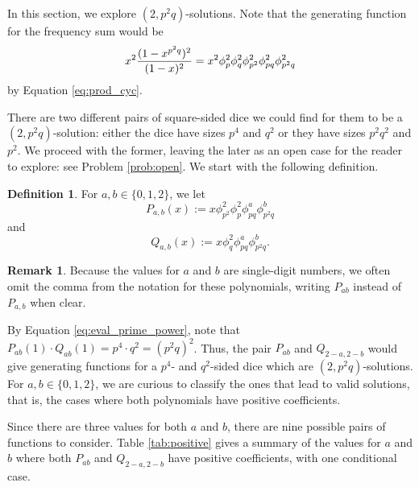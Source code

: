 \documentclass[11pt]{amsart}
\numberwithin{equation}{section}
\theoremstyle{plain}
\theoremstyle{definition}
\newtheorem{definition}[equation]{Definition}
\newtheorem{remark}[equation]{Remark}
\begin{document}
In this section, we explore $(2,p^2q)$-solutions. Note that the generating function for the frequency sum would be
\[x^2{(1-x^{p^2q})^2\over (1-x)^2}=x^2\phi_p^2\phi_q^2\phi_{p^2}^2\phi_{pq}^2\phi_{p^2q}^2\]
by Equation \eqref{eq:prod_cyc}.

There are two different pairs of square-sided dice we could find for them to be a $(2,p^2q)$-solution: either the dice have sizes $p^4$ and $q^2$ or they have sizes $p^2q^2$ and $p^2$. We proceed with the former, leaving the later as an open case for the reader to explore: see Problem \ref{prob:open}. We start with the following definition.

\begin{definition}
For $a,b\in \{0,1,2\}$, we let
$$P_{a,b}(x):=x{\phi}_{p^2}^2{\phi}_{p}^2{\phi}_{pq}^a{\phi}_{p^2q}^b$$
and
$$Q_{a,b}(x):=x{\phi}_{q}^2{\phi}_{pq}^a{\phi}_{p^2q}^b.$$

\end{definition}

\begin{remark}

Because the values for $a$ and $b$ are single-digit numbers, we often omit the comma from the notation for these polynomials, writing $P_{ab}$ instead of $P_{a,b}$ when clear. 
\end{remark}

By Equation \eqref{eq:eval_prime_power}, note that $P_{ab}(1)\cdot Q_{ab}(1)=p^4\cdot q^2=(p^2q)^2$. Thus, the pair $P_{ab}$ and $Q_{2-a,2-b}$ would give generating functions for a $p^4$- and $q^2$-sided dice which are $(2,p^2q)$-solutions. For $a,b\in\{0,1,2\}$, we are curious to classify the ones that lead to valid solutions, that is, the cases where both polynomials have positive coefficients.

Since there are three values for both $a$ and $b$, there are nine possible pairs of functions to consider. Table \ref{tab:positive} gives a summary of the values for $a$ and $b$ where both $P_{ab}$ and $Q_{2-a,2-b}$ have positive coefficients, with one conditional case. 
\end{document}
